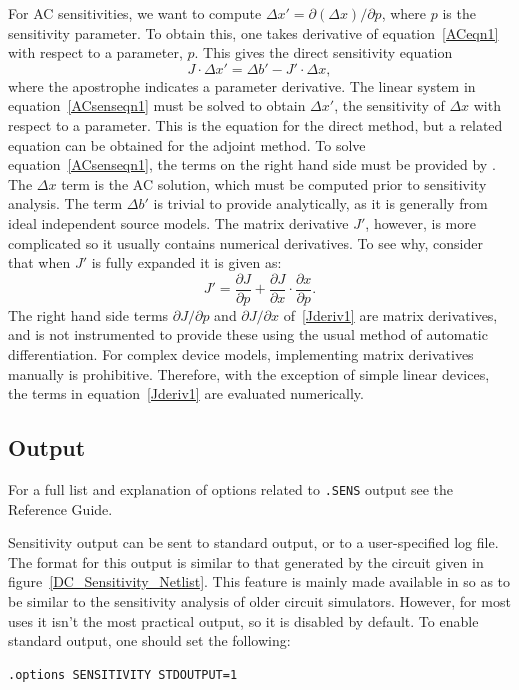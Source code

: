 For AC sensitivities, we want to compute $\Delta x' = \partial (\Delta x)/\partial p$, where $p$ is the sensitivity parameter.  To obtain  this, one takes derivative of equation~\ref{ACeqn1} with respect to a parameter, $p$. This gives the direct sensitivity equation 
\begin{equation}
J \cdot \Delta x' = \Delta b' - J' \cdot \Delta x,
  \label{ACsenseqn1}
\end{equation}
where the apostrophe indicates a parameter derivative.  The linear system in 
equation~\ref{ACsenseqn1} must be solved to  obtain $ \Delta x'$, the sensitivity 
of $\Delta x$ with respect to a parameter.   This is the equation for the direct 
method, but a related equation can be obtained for the adjoint method.  To solve 
equation~\ref{ACsenseqn1}, the terms on the right hand side must be provided by 
\Xyce{}.  The $\Delta x$ term is the AC solution, which must be computed prior to sensitivity analysis. 
The term $\Delta b'$ is trivial to provide analytically, as it is generally from ideal independent source models. The matrix derivative $J'$, however, is more complicated so it usually 
contains numerical derivatives.  To see why, consider that when $J'$ is fully 
expanded it is given as:
\begin{equation}
J' = \frac{\partial J}{\partial p} + \frac{\partial J}{\partial x} \cdot \frac{\partial x}{\partial p}.
  \label{Jderiv1}
\end{equation}
The right hand side terms $\partial J/\partial p$ and $\partial J/\partial x$ of~\ref{Jderiv1} 
are matrix derivatives, and 
\Xyce{} is not instrumented to provide these using the usual method of automatic differentiation.
For complex device models, implementing matrix derivatives manually is prohibitive.  Therefore, 
with the exception of simple linear devices, the terms in equation~\ref{Jderiv1} are
evaluated numerically.
\clearpage
\subsection{Output}
\label{SENS_Output}
For a full list and explanation of options related to \texttt{.SENS}
output see the \Xyce{} Reference Guide\ReferenceGuide{}.

Sensitivity output can be sent to standard output, or to a
user-specified log file.  The format for this output is similar to
that generated by the circuit given in
figure~\ref{DC_Sensitivity_Netlist}.  This feature is mainly made
available in \Xyce{} so as to be similar to the sensitivity analysis
of older circuit simulators.  However, for most uses it isn't the most
practical output, so it is disabled by default.  To enable standard
output, one should set the following:
\begin{verbatim}
.options SENSITIVITY STDOUTPUT=1
\end{verbatim}

